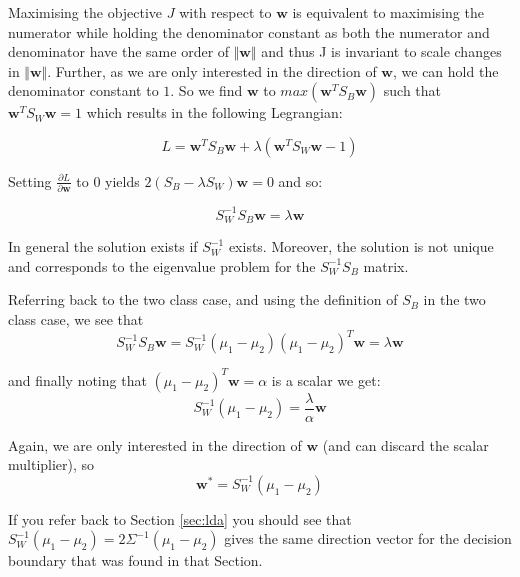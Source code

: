 \documentclass{article}
\begin{document}
Maximising the objective $J$ with respect to $\mathbf{w}$ is equivalent to maximising the numerator while holding the denominator constant as both the numerator and denominator have the same order of $\Vert\mathbf{w}\Vert$ and thus J is invariant to scale changes in $\Vert\mathbf{w}\Vert$. Further, as we are only interested in the direction of $\mathbf{w}$, we can hold the denominator constant to $1$. So we find $\mathbf{w}$ to $max (\mathbf{w}^TS_B\mathbf{w})$ such that $\mathbf{w}^TS_W\mathbf{w} = 1$ which results in the following Legrangian:

$$
L = \mathbf{w}^T S_B\mathbf{w} + \lambda(\mathbf{w}^T S_W\mathbf{w} - 1)
$$

Setting $\frac{\partial L}{\partial \mathbf{w}}$ to $0$ yields $2(S_B - \lambda S_W)\mathbf{w} = 0$ and so:

\begin{equation*}
  S_W^{-1}S_B \mathbf{w} = \lambda \mathbf{w}
\end{equation*}

In general the solution exists if $S_W^{-1}$ exists. Moreover, the solution is not unique and corresponds to the eigenvalue problem for the $S_W^{-1}S_B$ matrix.

Referring back to the two class case, and using the definition of $S_B$ in the two class case, we see that
\begin{equation*}
S_W^{-1}S_B \mathbf{w} = S_W^{-1}(\mu_1 - \mu_2)(\mu_1 - \mu_2)^T \mathbf{w} = \lambda \mathbf{w}
\end{equation*}

and finally noting that $(\mu_1 - \mu_2)^T \mathbf{w} = \alpha$ is a scalar we get:
\begin{equation*}
  S_W^{-1} (\mu_1 - \mu_2) = \frac{\lambda}{\alpha} \mathbf{w}
\end{equation*}


Again, we are only interested in the direction of $\mathbf{w}$ (and can discard the scalar multiplier), so
\begin{equation}
\mathbf{w^*} = S_W^{-1} (\mu_1 - \mu_2)
\end{equation}

If you refer back to Section \ref{sec:lda} you should see that $S_W^{-1} (\mu_1 - \mu_2) = 2\Sigma^{-1} (\mu_1 - \mu_2)$ gives the same direction vector for the decision boundary that was found in that Section.
\end{document}
